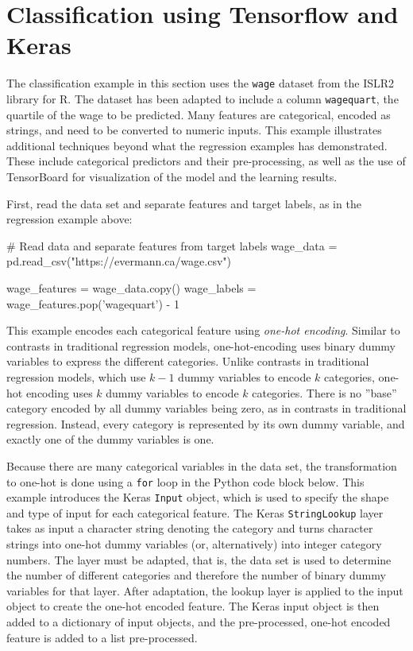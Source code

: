 \section{Classification using Tensorflow and Keras}

The classification example in this section uses the \texttt{wage} dataset from the ISLR2 library for R. The dataset has been adapted to include a column \texttt{wagequart}, the quartile of the wage to be predicted. Many features are categorical, encoded as strings, and need to be converted to numeric inputs. This example illustrates additional techniques beyond what the regression examples has demonstrated. These include categorical predictors and their pre-processing, as well as the use of TensorBoard for visualization of the model and the learning results.

First, read the data set and separate features and target labels, as in the regression example above:

\begin{pythoncode}
# Read data and separate features from target labels
wage_data = pd.read_csv("https://evermann.ca/wage.csv")
    
wage_features = wage_data.copy()
wage_labels = wage_features.pop('wagequart') - 1
\end{pythoncode}

This example encodes each categorical feature using \emph{one-hot encoding}. Similar to contrasts in traditional regression models, one-hot-encoding uses binary dummy variables to express the different categories. Unlike contrasts in traditional regression models, which use $k-1$ dummy variables to encode $k$ categories, one-hot encoding uses $k$ dummy variables to encode $k$ categories. There is no ''base'' category encoded by all dummy variables being zero, as in contrasts in traditional regression. Instead, every category is represented by its own dummy variable, and exactly one of the dummy variables is one. 

Because there are many categorical variables in the data set, the transformation to one-hot is done using a \texttt{for} loop in the Python code block below. This example introduces the Keras \texttt{Input} object, which is used to specify the shape and type of input for each categorical feature. The Keras \texttt{StringLookup} layer takes as input a character string denoting the category and turns character strings into one-hot dummy variables (or, alternatively) into integer category numbers. The layer must be adapted, that is, the data set is used to determine the number of different categories and therefore the number of binary dummy variables for that layer. After adaptation, the lookup layer is applied to the input object to create the one-hot encoded feature. The Keras input object is then added to a dictionary of input objects, and the pre-processed, one-hot encoded feature is added to a list pre-processed.

